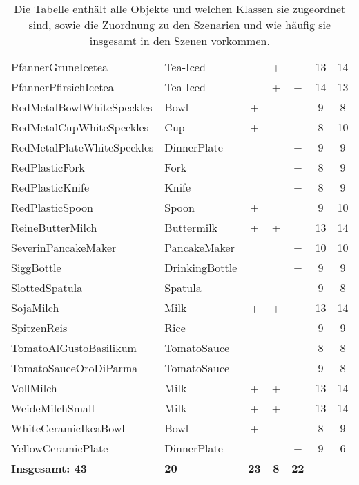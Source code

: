 \begin{table}
\begin{tabularx}{\textwidth}{llccccc}
PfannerGruneIcetea				& Tea-Iced			& 			& +			&	+		& 13	& 14\\
PfannerPfirsichIcetea			& Tea-Iced			& 			& +			&	+		& 14	& 13\\
RedMetalBowlWhiteSpeckles		& Bowl				& +			& 			&			& 9		& 8\\
RedMetalCupWhiteSpeckles		& Cup				& +			& 			&			& 8		& 10\\
RedMetalPlateWhiteSpeckles		& DinnerPlate		& 			& 			&	+		& 9		& 9\\
RedPlasticFork					& Fork				& 			& 			&	+		& 8		& 9\\
RedPlasticKnife					& Knife				& 			& 			&	+		& 8		& 9\\
RedPlasticSpoon					& Spoon				& +			& 			&			& 9		& 10\\
ReineButterMilch				& Buttermilk		& +			& +			&			& 13	& 14\\
SeverinPancakeMaker				& PancakeMaker		& 			& 			&	+		& 10	& 10\\
SiggBottle						& DrinkingBottle	& 			& 			&	+		& 9		& 9\\
SlottedSpatula					& Spatula			& 			& 			&	+		& 9		& 8\\
SojaMilch						& Milk				& +			& +			&			& 13	& 14\\
SpitzenReis						& Rice				& 			& 			&	+		& 9		& 9\\
TomatoAlGustoBasilikum			& TomatoSauce		& 			& 			&	+		& 8		& 8\\
TomatoSauceOroDiParma			& TomatoSauce		& 			& 			&	+		& 9		& 8\\
VollMilch						& Milk				& +			& +			&			& 13	& 14\\
WeideMilchSmall					& Milk				& +			& +			&			& 13	& 14\\
WhiteCeramicIkeaBowl			& Bowl				& +			& 			&			& 8		& 9\\
YellowCeramicPlate				& DinnerPlate 	    & 			& 			&	+		& 9		& 6\\ \hline
\textbf{Insgesamt: 43}				& \textbf{20}		& \textbf{23} & \textbf{8} & \textbf{22} & & \\
\end{tabularx}
\caption[Objekte und ihre Verteilung in den Szenen]{Die Tabelle enthält alle Objekte und welchen Klassen sie zugeordnet sind, sowie die Zuordnung zu den Szenarien und wie häufig sie insgesamt in den Szenen vorkommen.}
\label{tab:objects}
\end{table}
